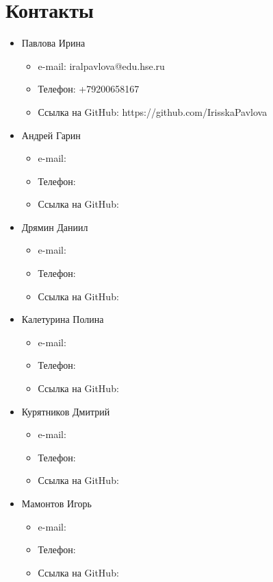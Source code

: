 \documentclass{article}
\begin{document}
\section{Контакты}
\begin{itemize}
    \item Павлова Ирина
    \begin{itemize}
        \item e-mail: iralpavlova@edu.hse.ru 
        \item Телефон: +79200658167 
        \item Ссылка на GitHub: https://github.com/IrisskaPavlova
    \end{itemize}
    \item Андрей Гарин
    \begin{itemize}
        \item e-mail:
        \item Телефон:
        \item Ссылка на GitHub:
    \end{itemize}
    \item Дрямин Даниил
    \begin{itemize}
        \item e-mail:
        \item Телефон:
        \item Ссылка на GitHub:
    \end{itemize}
    \item Калетурина Полина
    \begin{itemize}
        \item e-mail:
        \item Телефон:
        \item Ссылка на GitHub:
    \end{itemize}
    \item Курятников Дмитрий
    \begin{itemize}
        \item e-mail:
        \item Телефон:
        \item Ссылка на GitHub:
    \end{itemize}
    \item Мамонтов Игорь
    \begin{itemize}
        \item e-mail:
        \item Телефон:
        \item Ссылка на GitHub:
    \end{itemize}
  
    
\end{itemize}
\end{document}
